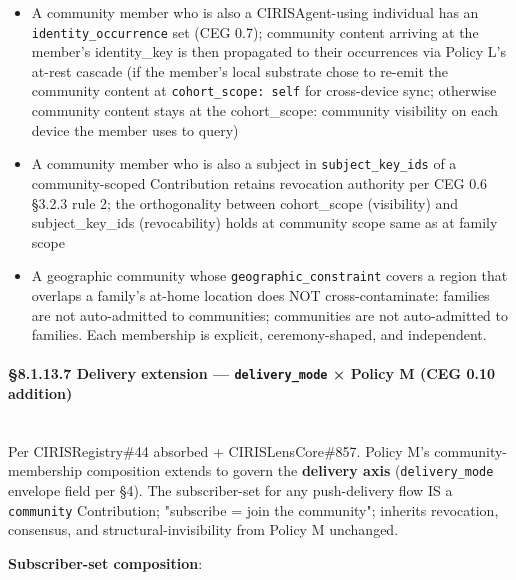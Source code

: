 \documentclass[11pt]{article}
\begin{document}
\begin{itemize}\setlength\itemsep{0pt}
\item A community member who is also a CIRISAgent-using individual has an \texttt{identity\_occurrence} set (CEG 0.7); community content arriving at the member's identity\_key is then propagated to their occurrences via Policy L's at-rest cascade (if the member's local substrate chose to re-emit the community content at \texttt{cohort\_scope: self} for cross-device sync; otherwise community content stays at the cohort\_scope: community visibility on each device the member uses to query)
\item A community member who is also a subject in \texttt{subject\_key\_ids} of a community-scoped Contribution retains revocation authority per CEG 0.6 §3.2.3 rule 2; the orthogonality between cohort\_scope (visibility) and subject\_key\_ids (revocability) holds at community scope same as at family scope
\item A geographic community whose \texttt{geographic\_constraint} covers a region that overlaps a family's at-home location does NOT cross-contaminate: families are not auto-admitted to communities; communities are not auto-admitted to families. Each membership is explicit, ceremony-shaped, and independent.
\end{itemize}


\paragraph{§8.1.13.7 Delivery extension — \texttt{delivery\_mode} × Policy M (CEG 0.10 addition)}\mbox{}\\


Per CIRISRegistry\#44 absorbed + CIRISLensCore\#857. Policy M's community-membership composition extends to govern the \textbf{delivery axis} (\texttt{delivery\_mode} envelope field per §4). The subscriber-set for any push-delivery flow IS a \texttt{community} Contribution; "subscribe = join the community"; inherits revocation, consensus, and structural-invisibility from Policy M unchanged.


\textbf{Subscriber-set composition}:
\end{document}
